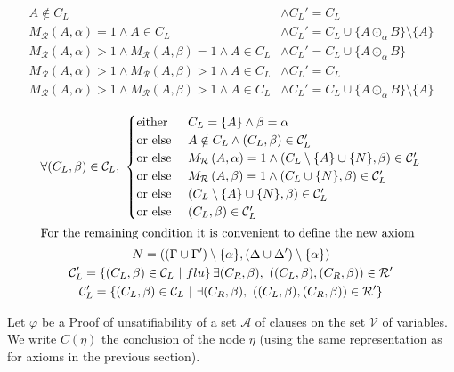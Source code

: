 \documentclass{article}
\newcommand{\ens}[2]{\left\{ #1 ~ \middle| ~ #2 \right\}}
\newcommand{\varSet}{\mathcal{V}}
\newcommand{\axiomSet}{\mathcal{A}}
\newcommand{\conSet}{\mathcal{C}}
\newcommand{\resoSet}{\mathcal{R}}
\newcommand{\Proof}{\varphi}
\newcommand{\node}{\eta}
\newcommand{\pConclusion}[1]{C\left(#1\right)} %
\newcommand{\reso}[1]{\odot_{#1}}
\newcommand{\connectivity}[3]{M_{#3} \left( #1 , #2 \right)}
\begin{document}
\begin{align}
  A \notin C_L
    &\wedge C_L' = C_L \\
  \connectivity{A}{\alpha}{\resoSet} = 1 \wedge A \in C_L
    &\wedge C_L' = C_L \cup \{ A \reso{\alpha} B \} \setminus \{ A \} \\
  \connectivity{A}{\alpha}{\resoSet} > 1 \wedge \connectivity{A}{\beta}{\resoSet} = 1 \wedge A \in C_L
    &\wedge C_L' = C_L \cup \{ A \reso{\alpha} B \} \\
  \connectivity{A}{\alpha}{\resoSet} > 1 \wedge \connectivity{A}{\beta}{\resoSet} > 1 \wedge A \in C_L
    &\wedge C_L' = C_L \\
  \connectivity{A}{\alpha}{\resoSet} > 1 \wedge \connectivity{A}{\beta}{\resoSet} > 1 \wedge A \in C_L
    &\wedge C_L' = C_L \cup \{ A \reso{\alpha} B \} \setminus \{ A \}
\end{align}

\begin{gather}
\forall (C_L,\beta) \in \conSet_L ,~
\begin{cases}
  \text{either}   & C_L = \{A\} \wedge \beta = \alpha \\
  \text{or else } & A \notin C_L \wedge (C_L,\beta) \in \conSet_L' \\
  \text{or else } & \connectivity{A}{\alpha}{\resoSet} = 1 \wedge
    (C_L \setminus \{A\} \cup \{N\}, \beta) \in \conSet_L' \\
  \text{or else } & \connectivity{A}{\beta}{\resoSet} = 1 \wedge
    (C_L \cup \{N\}, \beta) \in \conSet_L' \\
  \text{or else } & (C_L \setminus \{A\} \cup \{N\}, \beta) \in \conSet_L' \\
  \text{or else } & (C_L, \beta) \in \conSet_L' \\
\end{cases} \\
\shortintertext{For the remaining condition it is convenient to define the new axiom}
N = ((\Gamma \cup \Gamma') \setminus \{\alpha\}, (\Delta \cup \Delta') \setminus \{\alpha\})
\notag \\
\conSet_L' = \ens{(C_L,\beta) \in \conSet_L}{flu}
{\exists (C_R,\beta) ,~ ((C_L,\beta),(C_R,\beta)) \in \resoSet'} \\
\conSet_L' = \ens{(C_L,\beta) \in \conSet_L}
{\exists (C_R,\beta) ,~ ((C_L,\beta),(C_R,\beta)) \in \resoSet'}
\end{gather}

Let $\Proof$ be a Proof of unsatifiability of a set $\axiomSet$ of clauses on the set $\varSet$ of
variables. We write $\pConclusion{\node}$ the conclusion of the node $\node$ (using the same representation
as for axioms in the previous section).
\end{document}
